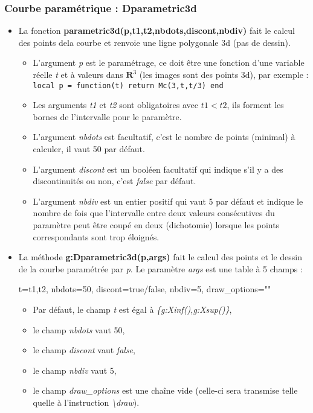 \subsubsection{Courbe paramétrique : Dparametric3d}

\begin{itemize}
\item La fonction \textbf{parametric3d(p,t1,t2,nbdots,discont,nbdiv)} fait le calcul des points dela courbe et renvoie une ligne polygonale 3d (pas de dessin).
  \begin{itemize}
    \item L'argument \emph{p} est le paramétrage, ce doit être une fonction d'une variable réelle \emph{t} et à valeurs dans $\mathbf R^3$ (les images sont des points 3d), par exemple :
    \texttt{local p = function(t) return Mc(3,t,t/3) end}
    
    \item  Les arguments \emph{t1} et \emph{t2} sont obligatoires avec \(t1 < t2\), ils forment les bornes de l'intervalle pour le paramètre.
    
    \item L'argument \emph{nbdots} est facultatif, c'est le nombre de points (minimal) à calculer, il vaut 50 par défaut.
    
    \item L'argument \emph{discont} est un booléen facultatif qui indique s'il y a des discontinuités ou non, c'est \emph{false} par défaut.
    
    \item L'argument \emph{nbdiv} est un entier positif qui vaut 5 par défaut et indique le nombre de fois que l'intervalle entre deux valeurs consécutives du paramètre peut être coupé en deux (dichotomie) lorsque les points correspondants sont trop éloignés.
  \end{itemize}
  
\item La méthode \textbf{g:Dparametric3d(p,args)} fait le calcul des points et le dessin de la courbe paramétrée par \emph{p}. Le paramètre \emph{args} est une table à 5 champs :

\begin{TeXcode}
 { t={t1,t2}, nbdots=50, discont=true/false, nbdiv=5, draw_options="" }
\end{TeXcode}

  \begin{itemize}
      \item Par défaut, le champ \emph{t} est égal à \emph{\{g:Xinf(),g:Xsup()\}},
      \item le champ \emph{nbdots} vaut 50, 
      \item le champ \emph{discont} vaut \emph{false},
      \item le champ \emph{nbdiv} vaut 5,
      \item le champ \emph{draw\_options} est une chaîne vide (celle-ci sera transmise telle quelle à l'instruction \emph{\textbackslash draw}).
  \end{itemize}
\end{itemize} 

